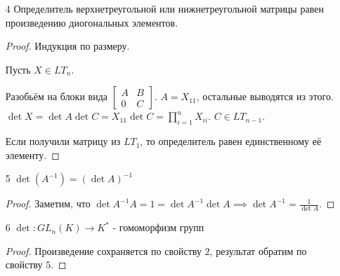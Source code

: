 \begin{properties}
\begin{enumerate}
\begin{proof}
            Сначала рассмотрим $\det \begin{bmatrix} E_{n} & B\\ 0 & E_m \end{bmatrix} $. Элементарными преобразованиями первого типа можно получить из неё $E_{n+m}$, значит определитель $1$.

            Заметим, что форма $A \to \det \begin{bmatrix} A & B\\ 0 & E_{m} \end{bmatrix} $ - форма объёма, значит она пропорциональна $\det A$, причём с коэффициентом  $1$.

            Теперь, рассмотрим форму $C \to \det \begin{bmatrix} A & B\\ 0 & C \end{bmatrix}$ - это форма объёма по строчкам $C$. Получаем, что оно пропорционально $\det C$ с коэффициентом $\det A$.

            Значит, $\det \begin{bmatrix} A & B\\ 0 & C \end{bmatrix} = \det A \det B$.
        \end{proof}
    \item[4] Определитель верхнетреугольной или нижнетреугольной матрицы равен произведению диогональных элементов.
        \begin{proof} \thmslashn
        
            Индукция по размеру.

            Пусть $X\in LT_{n}$.

            Разобьём на блоки вида $\begin{bmatrix} A & B\\ 0 & C \end{bmatrix} $. $A = X_{11}$, остальные выводятся из этого. $\det X = \det A \det C = X_{11} \det C = \prod\limits_{i=1}^{n} X_{ii} $. $C\in LT_{n-1}$.

            Если получили матрицу из $LT_1$, то определитель равен единственному её элементу.
        \end{proof}
    \item[5] $\det(A^{-1}) = (\det A)^{-1}$
        \begin{proof} \thmslashn
        
           Заметим, что $\det A^{-1}A = 1 = \det A^{-1}\det A \implies \det A^{-1} = \frac{1}{\det A}$. 
        \end{proof}
    \item[6] $\det : GL_{n}(K) \to K^{*}$ - гомоморфизм групп
        \begin{proof} \thmslashn
        
            Произведение сохраняется по свойству $2$, результат обратим по свойству $5$.
        \end{proof}
    \end{enumerate}
\end{properties}

